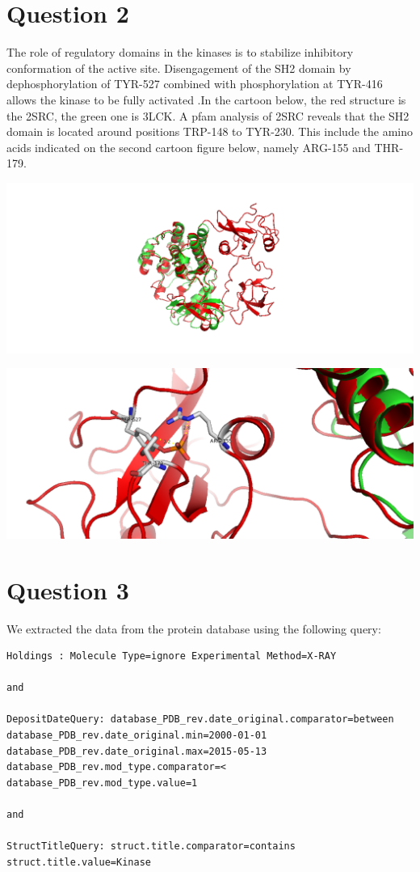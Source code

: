 \documentclass[11pt, a4paper,titlepage]{article}
\begin{document}
\section*{Question 2}

The role of regulatory domains in the kinases is to stabilize
inhibitory conformation of the active site. Disengagement of the SH2
domain by dephosphorylation of TYR-527 combined with phosphorylation
at TYR-416 allows the kinase to be fully activated
\cite{ConformationalPlasticityKinases}.In the cartoon below, the red
structure is the 2SRC, the green one is 3LCK. A pfam analysis of 2SRC
reveals that the SH2 domain is located around positions TRP-148 to
TYR-230. This include the amino acids indicated on the second cartoon
figure below, namely ARG-155 and THR-179.

\includegraphics[width=15cm]{./Figures/2a.png}

\includegraphics[width=15cm]{./Figures/2b.png}

\section*{Question 3}
We extracted the data from the protein database using the following query:

\begin{verbatim}
Holdings : Molecule Type=ignore Experimental Method=X-RAY 

and 

DepositDateQuery: database_PDB_rev.date_original.comparator=between 
database_PDB_rev.date_original.min=2000-01-01 database_PDB_rev.date_original.max=2015-05-13 
database_PDB_rev.mod_type.comparator=< database_PDB_rev.mod_type.value=1 

and 

StructTitleQuery: struct.title.comparator=contains struct.title.value=Kinase
\end{verbatim}
\end{document}
